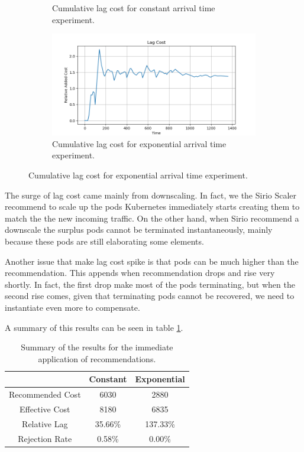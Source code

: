 \begin{figure}[H]
\begin{subfigure}{0.49\linewidth}
	    \caption{Cumulative lag cost for constant arrival time experiment.}
	    \label{fig:default_constant_lag}
	\end{subfigure}
	\begin{subfigure}{0.49\linewidth}
	    \centering
	    \includegraphics[width=1\linewidth]{images/default/exponential/lag_cost_cumulative.png}
	    \caption{Cumulative lag cost for exponential arrival time experiment.}
	    \label{fig:default_exponential_lag}
	\end{subfigure}
\end{figure}

The surge of lag cost came mainly from downscaling. In fact, we the Sirio Scaler recommend to scale up the pods Kubernetes immediately starts creating them to match the the new incoming traffic. On the other hand, when Sirio recommend a downscale the surplus pods cannot be terminated instantaneously, mainly because these pods are still elaborating some elements.

Another issue that make lag cost spike is that pods can be much higher than the recommendation. This appends when recommendation drops and rise very shortly. In fact, the first drop make most of the pods terminating, but when the second rise comes, given that terminating pods cannot be recovered, we need to instantiate even more to compensate.

A summary of this results can be seen in table \ref{tab:default_summary}.

\begin{table}[h]
	\centering
	\begin{tabular}{|c|c|c|}
		\hline
		& Constant & Exponential \\
		\hline
		Recommended Cost & 6030 & 2880 \\
		\hline
		Effective Cost & 8180 & 6835 \\
		\hline
		Relative Lag & 35.66\% & 137.33\%  \\
		\hline
		Rejection Rate & 0.58\% & 0.00\% \\
		\hline
	\end{tabular}
	\caption{Summary of the results for the immediate application of recommendations.}
	\label{tab:default_summary}
\end{table}

